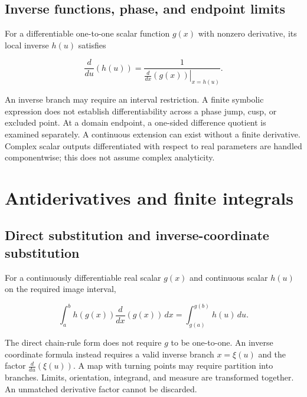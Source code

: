 \documentclass[11pt,oneside,openany]{book}
\begin{document}
\par\addvspace{8pt}\noindent\begin{minipage}{\linewidth}
\subsection{Inverse functions, phase, and endpoint limits}

For a differentiable one-to-one scalar function \(g(x)\) with nonzero derivative,
its local inverse \(h(u)\) satisfies

\[
\frac{d}{du}\left(h(u)\right)
=\frac{1}{\left.\frac{d}{dx}(g(x))\right|_{x=h(u)}}.
\]

An inverse branch may require an interval restriction. A finite symbolic
expression does not establish differentiability across a phase jump, cusp,
or excluded point. At a domain endpoint, a one-sided difference quotient is
examined separately. A continuous extension can exist without a finite derivative.
Complex scalar outputs differentiated with respect to real parameters are
handled componentwise; this does not assume complex analyticity.

\end{minipage}\par
\par\addvspace{8pt}\noindent\begin{minipage}{\linewidth}
\section{Antiderivatives and finite integrals}

\subsection{Direct substitution and inverse-coordinate substitution}

For a continuously differentiable real scalar \(g(x)\) and continuous scalar
\(h(u)\) on the required image interval,

\[
\int_a^b h(g(x))\frac{d}{dx}\left(g(x)\right)\,dx
=\int_{g(a)}^{g(b)}h(u)\,du.
\]

The direct chain-rule form does not require \(g\) to be one-to-one. An inverse
coordinate formula instead requires a valid inverse branch \(x=\xi(u)\) and the
factor \(\frac{d}{du}(\xi(u))\). A map with turning points may require partition
into branches. Limits, orientation, integrand, and measure are transformed together.
An unmatched derivative factor cannot be discarded.

\end{minipage}\par
\end{document}
